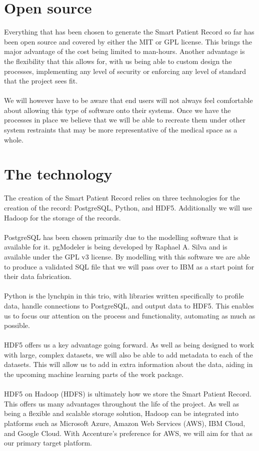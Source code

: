 \section{Open source}
Everything that has been chosen to generate the Smart Patient Record so far has been open source and covered by either the MIT or GPL license. This brings the major advantage of the cost being limited to man-hours. Another advantage is the flexibility that this allows for, with us being able to custom design the processes, implementing any level of security or enforcing any level of standard that the project sees fit. 
\\ \\
\noindent
We will however have to be aware that end users will not always feel comfortable about allowing this type of software onto their systems. Once we have the processes in place we believe that we will be able to recreate them under other system restraints that may be more representative of the medical space as a whole. 

\section{The technology}
The creation of the Smart Patient Record relies on three technologies for the creation of the record: PostgreSQL, Python, and HDF5. Additionally we will use Hadoop for the storage of the records. 
\\ \\
\noindent
PostgreSQL has been chosen primarily due to the modelling software that is available for it. pgModeler is being developed by Raphael A. Silva and is available under the GPL v3 license. By modelling with this software we are able to produce a validated SQL file that we will pass over to IBM as a start point for their data fabrication. 
\\ \\
\noindent
Python is the lynchpin in this trio, with libraries written specifically to profile data, handle connections to PostgreSQL, and output data to HDF5. This enables us to focus our attention on the process and functionality, automating as much as possible.
\\ \\
\noindent
HDF5 offers us a key advantage going forward. As well as being designed to work with large, complex datasets, we will also be able to add metadata to each of the datasets. This will allow us to add in extra information about the data, aiding in the upcoming machine learning parts of the work package.  
\\ \\
\noindent
HDF5 on Hadoop (HDFS) is ultimately how we store the Smart Patient Record. This offers us many advantages throughout the life of the project. As well as being a flexible and scalable storage solution, Hadoop can be integrated into platforms such as Microsoft Azure, Amazon Web Services (AWS), IBM Cloud, and Google Cloud. With Accenture's preference for AWS, we will aim for that as our primary target platform.

